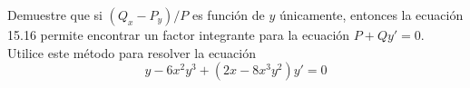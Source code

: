 \item Demuestre que si $(Q_x - P_y)/P$ es función de $y$ únicamente, entonces la ecuación 15.16 permite encontrar un factor integrante para la ecuación $P + Qy' = 0$. Utilice este método para resolver la ecuación
    \[ y - 6x^2y^3 + (2x - 8x^3y^2)y' = 0 \]
